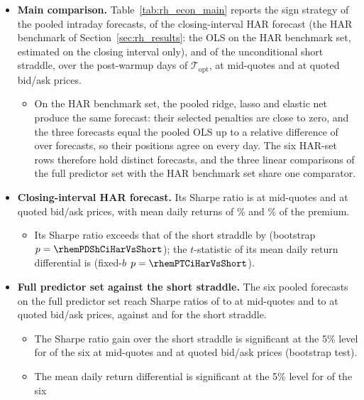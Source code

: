 \begin{itemize}
\item \textbf{Main comparison.} Table~\ref{tab:rh_econ_main} reports the sign strategy of the \rhrPoolN{} pooled
  intraday forecasts, of the closing-interval HAR forecast (the HAR benchmark of Section~\ref{sec:rh_results}: the OLS
  on the HAR benchmark set, estimated on the closing interval only), and of the unconditional short straddle, over the
  \rheSzDays{} post-warmup days of $\mathcal T_{\mathrm{opt}}$, at mid-quotes and at quoted bid/ask prices.
  \begin{itemize}
  \item On the HAR benchmark set, the pooled ridge, lasso and elastic net produce the same forecast: their selected
    penalties are close to zero, and the three forecasts equal the pooled OLS up to a relative difference of
    \rhemHarLinMaxRelDiff{} over \rhemHarLinNRows{} forecasts, so their positions agree on every day. The six
    HAR-set rows therefore hold \rhemHarDistinctWord{} distinct forecasts, and the three linear comparisons of the
    full predictor set with the HAR benchmark set share one comparator.
  \end{itemize}
\item \textbf{Closing-interval HAR forecast.} Its Sharpe ratio is \rhemShCiHar{} at mid-quotes and \rhemShXCiHar{} at
  quoted bid/ask prices, with mean daily returns of \rhemMeanCiHar\% and \rhemMeanXCiHar\% of the premium.
  \begin{itemize}
  \item Its Sharpe ratio exceeds that of the short straddle by \rhemDShCiHarVsShort{} (bootstrap
    $p = \rhemPDShCiHarVsShort$); the $t$-statistic of its mean daily return differential is \rhemTCiHarVsShort{}
    (fixed-$b$ $p = \rhemPTCiHarVsShort$).
  \end{itemize}
\item \textbf{Full predictor set against the short straddle.} The six pooled forecasts on the full predictor set reach
  Sharpe ratios of \rhrPoolShFullMin{} to \rhrPoolShFullMax{} at mid-quotes and \rhrPoolShXFullMin{} to
  \rhrPoolShXFullMax{} at quoted bid/ask prices, against \rheShortSh{} and \rheShortShX{} for the short straddle.
  \begin{itemize}
  \item The Sharpe ratio gain over the short straddle is significant at the 5\% level for \rhemFullVsShortSigWord{}
    of the six at mid-quotes and \rhemFullVsShortSigXWord{} at quoted bid/ask prices (bootstrap test).
  \item The mean daily return differential is significant at the 5\% level for \rhemFullTVsShortSigWord{} of the six

\end{itemize}
\end{itemize}
